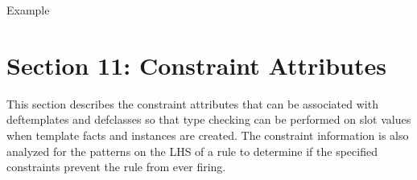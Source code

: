 \documentclass[letterpaper,10pt,english]{sphinxmanual}
\begin{document}
Example

\begin{sphinxVerbatim}[commandchars=\\\{\}]
 
  
 
     
    
  
 
     
  
 
     
 
 
    
    
    
\end{sphinxVerbatim}
\label{\detokenize{defmodule:section-8}}

\chapter{Section 11: Constraint Attributes}
\label{\detokenize{constraints:section-11-constraint-attributes}}\label{\detokenize{constraints::doc}}
This section describes the constraint attributes that can be associated
with deftemplates and defclasses so that type checking can be performed
on slot values when template facts and instances are created. The
constraint information is also analyzed for the patterns on the LHS of a
rule to determine if the specified constraints prevent the rule from
ever firing.
\end{document}
